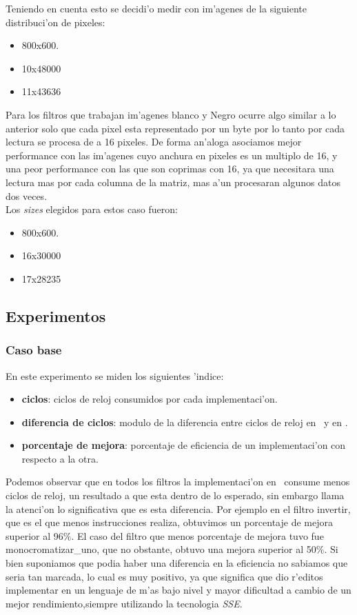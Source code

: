 Teniendo en cuenta esto se decidi'o medir con im'agenes de la siguiente distribuci'on de pixeles:
 \begin{itemize}
 \item{800x600}.
 \item{10x48000}
 \item{11x43636}
\end{itemize}
Para los filtros que trabajan im'agenes blanco y Negro ocurre algo similar a lo anterior solo que cada
pixel esta representado por un byte por lo tanto por cada lectura se procesa de a 16 pixeles. De forma
an'aloga asociamos mejor performance con las im'agenes cuyo anchura en pixeles es un multiplo de 16, y 
una peor performance con las que son coprimas con 16, ya que necesitara una lectura mas por cada columna
de la matriz, mas a'un procesaran algunos datos dos veces. \\
Los \textit{sizes} elegidos para estos caso fueron:\\
\begin{itemize}
 \item{800x600}.
 \item{16x30000}
 \item{17x28235}
\end{itemize}


\subsection{Experimentos}
\subsubsection{Caso base}
En este experimento se miden los siguientes 'indice:
\begin{itemize}
 \item{} \textbf{ciclos}: ciclos de reloj consumidos por cada implementaci'on.
 \item{} \textbf{diferencia de ciclos}: modulo de la diferencia entre ciclos de reloj en \C \ y en \ass.
 \item{} \textbf{porcentaje de mejora}: porcentaje de eficiencia de un implementaci'on con respecto a la otra.
\end{itemize}

Podemos observar que en todos los filtros 
la implementaci'on en \ass \ consume
menos ciclos de reloj, un resultado a que esta dentro de lo esperado, sin embargo llama la atenci'on
lo significativa que es esta diferencia. Por ejemplo en el filtro invertir, que es el que menos instrucciones
realiza, obtuvimos un porcentaje de mejora superior al 96$\%$. El caso del filtro que menos porcentaje
de mejora tuvo fue monocromatizar_uno, que no obstante, obtuvo una mejora superior al 50$\%$. Si bien
suponiamos que podia haber una diferencia en la eficiencia no sabiamos que seria tan marcada, lo cual es muy 
positivo, ya que significa que dio r'editos implementar en un lenguaje de m'as bajo nivel y mayor dificultad
 a cambio de un mejor rendimiento,siempre utilizando la tecnologia \textit{SSE}.\\

